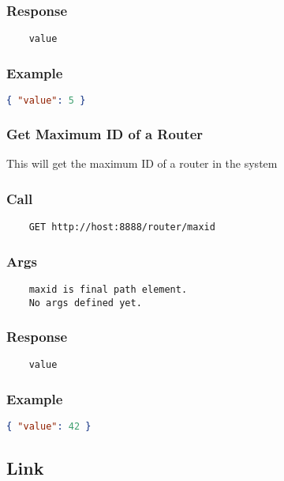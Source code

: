 \subsubsection*{Response}
\begin{verbatim}
	value
\end{verbatim}

\subsubsection*{Example}
\begin{lstlisting}[language=json]
{ "value": 5 }
\end{lstlisting}


\hr
\subsubsection{Get Maximum ID of a Router}
This will get the maximum ID of a router in the system

\subsubsection*{Call}
\begin{verbatim}
	GET http://host:8888/router/maxid
\end{verbatim}

\subsubsection*{Args}
\begin{verbatim}
	maxid is final path element.
	No args defined yet.
\end{verbatim}

\subsubsection*{Response}
\begin{verbatim}
	value
\end{verbatim}

\subsubsection*{Example}
\begin{lstlisting}[language=json]
{ "value": 42 }
\end{lstlisting}


\subsection{Link}
        
